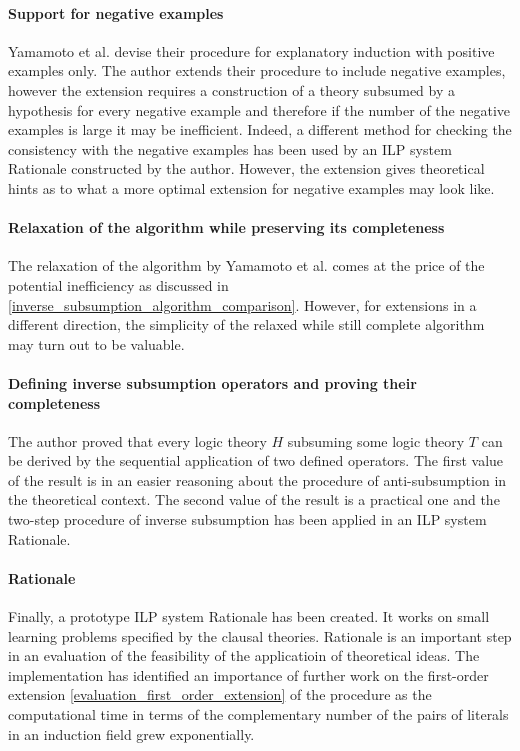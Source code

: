 \paragraph{Support for negative examples}
Yamamoto et al. devise their procedure for explanatory induction with positive examples only. The author extends their procedure to include negative examples, however the extension requires a construction of a theory subsumed by a hypothesis for every negative example and therefore if the number of the negative examples is large it may be inefficient. Indeed, a different method for checking the consistency with the negative examples has been used by an ILP system Rationale constructed by the author. However, the extension gives theoretical hints as to what a more optimal extension for negative examples may look like.

\paragraph{Relaxation of the algorithm while preserving its completeness}
The relaxation of the algorithm by Yamamoto et al. comes at the price of the potential inefficiency as discussed in \ref{inverse_subsumption_algorithm_comparison}. However, for extensions in a different direction, the simplicity of the relaxed while still complete algorithm may turn out to be valuable.

\paragraph{Defining inverse subsumption operators and proving their completeness}
The author proved that every logic theory $H$ subsuming some logic theory $T$ can be derived by the sequential application of two defined operators. The first value of the result is in an easier reasoning about the procedure of anti-subsumption in the theoretical context. The second value of the result is a practical one and the two-step procedure of inverse subsumption has been applied in an ILP system Rationale.

\paragraph{Rationale} Finally, a prototype ILP system Rationale has been created. It works on small learning problems specified by the clausal theories. Rationale is an important step in an evaluation of the feasibility of the applicatioin of theoretical ideas. The implementation has identified an importance of further work on the first-order extension \ref{evaluation_first_order_extension} of the procedure as the computational time in terms of the complementary number of the pairs of literals in an induction field grew exponentially.

